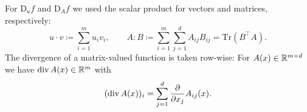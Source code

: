\documentclass[12pt,a4paper]{article}
\begin{document}
For $\mathrm{D}_u f$ and $\mathrm{D}_A f$
we used the scalar product for vectors and matrices, respectively:
\[
u\cdot v \coloneqq \sum_{i=1}^m u_i v_i,
\qquad
A:B\coloneqq \sum_{i=1}^m\sum_{j=1}^d A_{ij}B_{ij}=\mathrm{Tr}(B^\top A).
\]
The divergence of a matrix-valued function is taken row-wise:
For $A(x)\in{\mathbb R}^{m\times d}$ we have $\mathop{\mathrm{div}}\nolimits A(x) \in {\mathbb R}^m$ with
\[
(\mathop{\mathrm{div}}\nolimits A(x))_i = \sum_{j=1}^d \frac{\partial}{\partial x_j}A_{ij}(x).
\]
\end{document}
